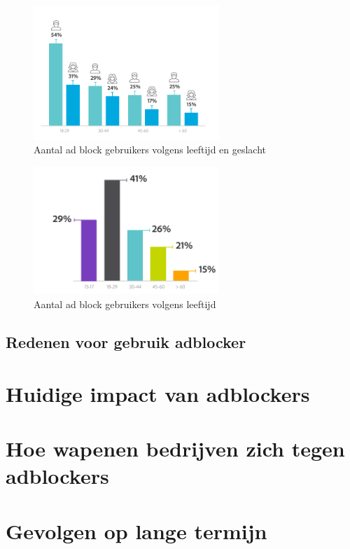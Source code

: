 \documentclass[pdftex,a4paper,12pt,twoside]{report}
\begin{document}
\begin{figure}
\centering
\includegraphics[width=7cm]{img/demographicsMV}
\caption{Aantal ad block gebruikers volgens leeftijd en geslacht}
\label{fig: Demographic_age_sex}
\end{figure}
\begin{figure}
\centering
\includegraphics[width=7cm]{img/demographicsAge}
\caption{Aantal ad block gebruikers volgens leeftijd}
\label{fig: Demographic_age}
\end{figure}



\section{Redenen voor gebruik adblocker}
\label{sec:Redenen voor gebruik adblocker}
\chapter{Huidige impact van adblockers}
\label{ch:Huidige impact van adblockers}
\chapter{Hoe wapenen bedrijven zich tegen adblockers}
\label{ch:Hoe wapenen bedrijven zich tegen adblockers}
\chapter{Gevolgen op lange termijn}
\label{ch:Gevolgen op lange termijn}
\end{document}
